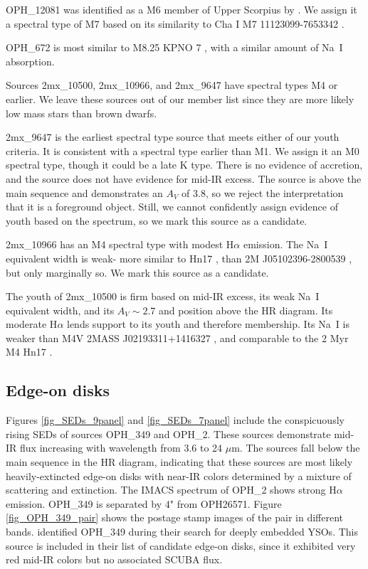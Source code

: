OPH\_12081 was identified as a M6 member of Upper Scorpius by \citet{2006AJ....131.3016S}.  We assign it a spectral type of M7 based on its similarity to Cha I M7 11123099-7653342 \citep{2004ApJ...602..816L}.

OPH\_672 is most similar to M8.25 KPNO 7 \citep{1998AJ....115.2074B,2003ApJ...593.1093L}, with a similar amount of Na~I absorption.

Sources 2mx\_10500, 2mx\_10966, and 2mx\_9647 have spectral types M4 or earlier.  We leave these sources out of our member list since they are more likely low mass stars than brown dwarfs.

2mx\_9647 is the earliest spectral type source that meets either of our youth criteria.  It is consistent with a spectral type earlier than M1.  We assign it an M0 spectral type, though it could be a late K type.  There is no evidence of accretion, and the source does not have evidence for mid-IR excess.  The source is above the main sequence and demonstrates an $A_V$ of 3.8, so we reject the interpretation that it is a foreground object.  Still, we cannot confidently assign evidence of youth based on the spectrum, so we mark this source as a candidate.

2mx\_10966 has an M4 spectral type with modest H$\alpha$ emission.  The Na~I equivalent width is weak- more similar to Hn17 \citep{2004ApJ...602..816L}, than 2M J05102396-2800539 \citep{2007AJ....133..439C}, but only marginally so.  We mark this source as a candidate.

The youth of 2mx\_10500 is firm based on mid-IR excess, its weak Na~I equivalent width, and its $A_V\sim2.7$ and position above the HR diagram.  Its moderate H$\alpha$ lends support to its youth and therefore membership.  Its Na~I is weaker than M4V 2MASS J02193311+1416327 \citep{2003AJ....126.2421C}, and comparable to the 2 Myr M4 Hn17 \citep{2004ApJ...602..816L}.



\subsection{Edge-on disks}
Figures \ref{fig_SEDs_9panel} and \ref{fig_SEDs_7panel} include the conspicuously rising SEDs of sources OPH\_349 and OPH\_2.  These sources demonstrate mid-IR flux increasing with wavelength from 3.6 to 24 $\mu$m.  The sources fall below the main sequence in the HR diagram, indicating that these sources are most likely heavily-extincted edge-on disks with near-IR colors determined by a mixture of scattering and extinction.  The IMACS spectrum of OPH\_2 shows strong H$\alpha$ emission.  OPH\_349 is separated by 4" from OPH26571.  Figure \ref{fig_OPH_349_pair} shows the postage stamp images of the pair in different bands.  \cite{2008ApJ...683..822J} identified OPH\_349 during their search for deeply embedded YSOs.  This source is included in their list of candidate edge-on disks, since it exhibited very red mid-IR colors but no associated SCUBA flux.


